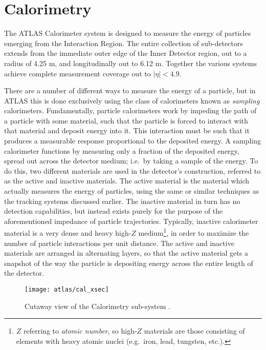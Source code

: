 \pagebreak
\section{Calorimetry} \label{sec:calorimeter}

    The ATLAS Calorimeter system is designed to measure the energy of particles emerging from the Interaction Region.
    The entire collection of sub-detectors extends from the immediate outer edge of the Inner Detector region, out to a radius of 4.25 m, and longitudinally out to 6.12 m.
    Together the various systems achieve complete measurement coverage out to $|\eta| < 4.9$.

    There are a number of different ways to measure the energy of a particle, but in ATLAS this is done exclusively using the class of calorimeters known as \textit{sampling} calorimeters.
    Fundamentally, particle calorimeters work by impeding the path of a particle with some material, such that the particle is forced to interact with that material and deposit energy into it.
    This interaction must be such that it produces a measurable response proportional to the deposited energy.
    A sampling calorimeter functions by measuring only a fraction of the deposited energy, spread out across the detector medium; i.e.\ by taking a sample of the energy.
    To do this, two different materials are used in the detector's construction, referred to as the active and inactive materials.
    The active material is the material which actually measures the energy of particles, using the same or similar techniques as the tracking systems discussed earlier.
    The inactive material in turn has no detection capabilities, but instead exists purely for the purpose of the aforementioned impedance of particle trajectories.
    Typically, inactive calorimeter material is a very dense and heavy high-$Z$ medium\footnote{
            $Z$ referring to \textit{atomic number},
                so high-$Z$ materials are those consisting of elements with heavy atomic nuclei (e.g.\ iron, lead, tungsten, etc.).
        }, in order to maximize the number of particle interactions per unit distance.
    The active and inactive materials are arranged in alternating layers, so that the active material gets a snapshot of the way the particle is depositing energy across the entire length of the detector.\cite{energy_measurement}

    \begin{figure}
        \texttt{[image: atlas/cal\_xsec]}
        \caption{Cutaway view of the Calorimetry sub-system \cite{atlas_tdr}.}
        \label{fig:cal_xsec}
    \end{figure}

